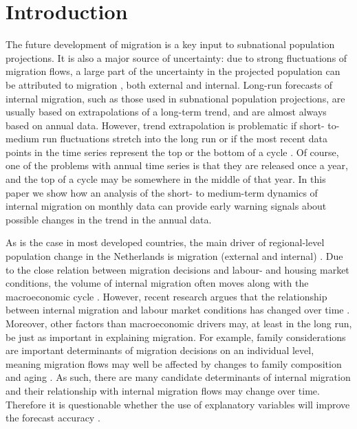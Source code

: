 \documentclass[12pt, a4paper]{article}
\begin{document}
\section{Introduction}\label{introduction}

The future development of migration is a key input to subnational population projections. It is also a major source of uncertainty: due to strong fluctuations of migration flows, a large part of the uncertainty in the projected population can be attributed to migration \citep{beer1993forecast}, both external and internal. Long-run forecasts of internal migration, such as those used in subnational population projections, are usually based on extrapolations of a long-term trend, and are almost always based on annual data. However, trend extrapolation is problematic if short- to-medium run fluctuations stretch into the long run or if the most recent data points in the time series represent the top or the bottom of a cycle \citep{canova1998detrending, hamilton2018}. Of course, one of the problems with annual time series is that they are released once a year, and the top of a cycle may be somewhere in the middle of that year. In this paper we show how an analysis of the short- to medium-term dynamics of internal migration on monthly data can provide early warning signals about possible changes in the trend in the annual data.

As is the case in most developed countries, the main driver of
regional-level population change in the Netherlands is migration
(external and internal) \citep{teriele2019}. Due to the close relation between migration
decisions and labour- and housing market conditions, the volume of
internal migration often moves along with the macroeconomic cycle \citep{husby2019trek}. However,
recent research argues that the relationship between internal migration and labour market conditions has changed over time \citep{kaplan2017understanding}. Moreover, other
factors than macroeconomic drivers may, at least in the long run, be just as important in explaining migration. For example, family considerations are important
determinants of migration decisions on an individual level, meaning
migration flows may well be affected by changes to family composition
and aging \citep{mulder2018putting}. As such, there are many candidate determinants of internal migration and their relationship with internal migration flows may change over time. Therefore it is questionable whether the use of explanatory variables will improve the forecast accuracy \citep{makridakis2019forecasting}.
\end{document}

